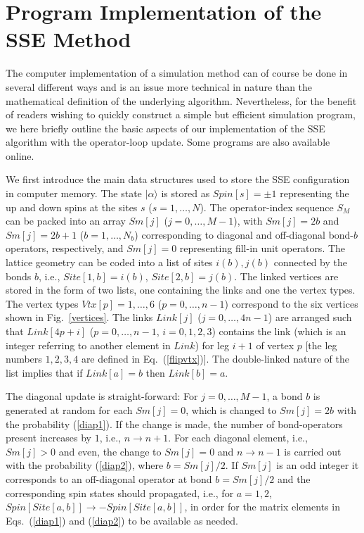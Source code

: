 \documentclass[10pt,pre,aps,twocolumn,showpacs,superscriptaddress,
floatfix]{revtex4}
\begin{document}
\appendix

\section{Program Implementation of the SSE Method}

The computer implementation of a simulation method can of course be done
in several different ways and is an issue more technical in nature than
the mathematical definition of the underlying algorithm. Nevertheless, for 
the benefit of readers wishing to quickly construct a simple but efficient 
simulation program, we here briefly outline the basic aspects of our 
implementation of the SSE algorithm with the operator-loop update.
Some programs are also available online\cite{www}.

We first introduce the main data structures used to store the SSE 
configuration in computer memory. The state $|\alpha \rangle$ is stored as 
$Spin[s]=\pm 1$ representing the up and down spins at the sites $s$ 
($s=1,\ldots,N$). The operator-index sequence $S_M$ can be packed into an 
array $Sm[j]$ ($j=0,\ldots ,M-1$), with $Sm[j]=2b$ and $Sm[j]=2b+1$ 
($b=1,\ldots ,N_b$) corresponding to diagonal and off-diagonal bond-$b$ 
operators, respectively, and $Sm[j]=0$ representing fill-in unit operators. 
The lattice geometry can be coded into a list of sites $i(b),j(b)$ connected 
by the bonds $b$, i.e., $Site[1,b]=i(b)$, $Site[2,b]=j(b)$. The linked 
vertices are stored in the form of two lists, one containing the links and 
one the vertex types. The vertex types $Vtx[p]=1,\ldots,6$ ($p=0,\ldots, n-1$)
correspond to the six vertices shown in Fig.~\ref{vertices}. The links 
$Link[j]$ ($j=0,\ldots,4n-1$) are arranged such that $Link[4p+i]$ 
($p=0,\ldots,n-1$, $i=0,1,2,3$) contains the link (which is an integer
referring to another element in $Link$) for leg $i+1$ of vertex $p$ [the 
leg numbers $1,2,3,4$ are defined in Eq.~(\ref{flipvtx})]. The 
double-linked nature of the list implies that if $Link[a]=b$ 
then $Link[b]=a$. 

The diagonal update is straight-forward: For $j=0,\ldots,M-1$, a bond $b$
is generated at random for each $Sm[j]=0$, which is changed to $Sm[j]=2b$
with the probability (\ref{diap1}). If the change is made, the number of
bond-operators present increases by $1$, i.e., $n \to n+1$. For each diagonal
element, i.e., $Sm[j] > 0$ and even, the change to $Sm[j]=0$ and $n \to n-1$ 
is carried out with the probability (\ref{diap2}), where $b=Sm[j]/2$. If 
$Sm[j]$ is an odd integer it corresponds to an off-diagonal operator at 
bond $b=Sm[j]/2$ and the corresponding spin states should propagated, i.e.,
for $a=1,2$, $Spin[Site[a,b]] \to -Spin[Site[a,b]]$, in order for the matrix 
elements in Eqs.~(\ref{diap1}) and (\ref{diap2}) to be available as needed.
\end{document}
